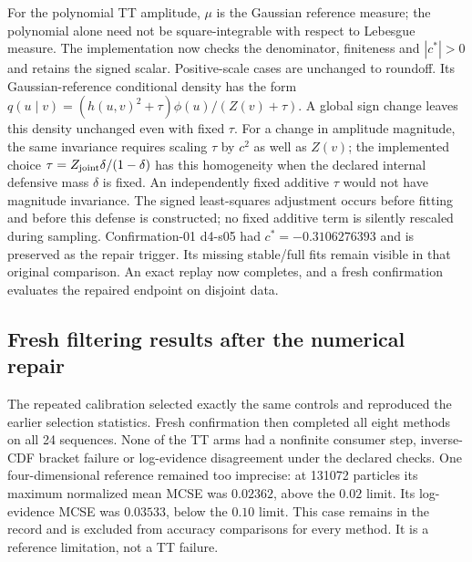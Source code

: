 \documentclass[11pt]{article}
\begin{document}
For the polynomial TT amplitude, $\mu$ is the Gaussian reference measure;
the polynomial alone need not be square-integrable with respect to Lebesgue
measure. The implementation now checks the denominator, finiteness and $|c^*|>0$ and
retains the signed scalar. Positive-scale cases are unchanged to roundoff.
Its Gaussian-reference conditional density has the form
$q(u\mid v)=(h(u,v)^2+\tau)\phi(u)/(Z(v)+\tau)$.
A global sign change leaves this density unchanged even with fixed $\tau$.
For a change in amplitude magnitude, the same invariance requires scaling
$\tau$ by $c^2$ as well as $Z(v)$; the implemented choice
$\tau=Z_{\rm joint}\delta/(1-\delta)$ has this homogeneity when
the declared internal defensive mass $\delta$ is fixed. An independently
fixed additive $\tau$ would not have magnitude invariance. The signed
least-squares adjustment occurs before fitting and before this defense is
constructed; no fixed additive term is silently rescaled during sampling.
Confirmation-01 d4-s05 had $c^*=-0.3106276393$ and is preserved as the
repair trigger. Its missing stable/full fits remain visible in that original
comparison. An exact replay now completes, and a fresh confirmation evaluates
the repaired endpoint on disjoint data.

\subsection{Fresh filtering results after the numerical repair}

The repeated calibration selected exactly the same controls and reproduced
the earlier selection statistics. Fresh confirmation then completed all eight
methods on all 24 sequences. None of the TT arms had a nonfinite consumer
step, inverse-CDF bracket failure or log-evidence disagreement under the
declared checks. One four-dimensional reference remained too imprecise:
at 131072 particles its maximum normalized mean MCSE was $0.02362$, above
the $0.02$ limit. Its log-evidence MCSE was $0.03533$, below the $0.10$
limit. This case remains in the record and is excluded from accuracy
comparisons for every method. It is a reference limitation, not a TT failure.
\end{document}
